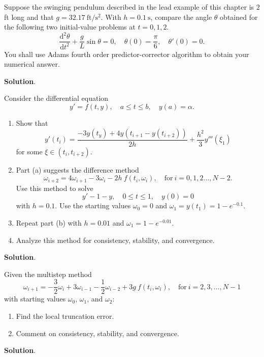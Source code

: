 \documentclass[11pt]{article}
\theoremstyle{break}
\newcommand{\dd}{\text{d}}
\numberwithin{equation}{theorem}
\begin{document}
\newpage
\begin{problem}\label{problem 15} %
    Suppose the swinging pendulum described in the lead example of this chapter is $2$ ft long and that $g = 32.17\ \text{ft}/\text{s}^2$. With $h = 0.1\ \text{s}$, compare the angle $\theta$ obtained for the following two initial-value problems at $t = 0, 1, 2$. $$\dfrac{\dd^2\theta}{\dd t^2}+\dfrac{g}{L}\sin\theta=0, \quad \theta(0)=\dfrac{\pi}{6},\quad \theta'(0)=0.$$ You shall use Adams fourth order predictor-corrector algorithm to obtain your numerical answer.
\end{problem}
\textbf{Solution}. 


\newpage
\begin{problem}\label{problem 16} %
    Consider the differential equation $$y'=f(t, y), \quad a\leq t\leq b, \quad y(a)=\alpha.$$
    \begin{enumerate}
        \item Show that $$y'(t_i)=\dfrac{-3y(t_y)+4y(t_{i+1}-y(t_{i+2}))}{2h}+\dfrac{h^2}{3}y'''(\xi_1)$$ for some $\xi\in(t_i, t_{i+2})$.
        \item Part (a) suggests the difference method $$\omega_{i+2}=4\omega_{i+1}-3\omega_{i}-2h\:f(t_i, \omega_i), \quad\text{for}\ i=0,1,2\dots, N-2.$$ Use this method to solve $$y'-1-y, \quad 0\leq t\leq 1, \quad y(0)=0$$ with $h=0.1$. Use the starting values $\omega_0=0$ and $\omega_1=y(t_1)=1-e^{-0.1}$.
        \item Repeat part (b) with $h=0.01$ and $\omega_1=1-e^{-0.01}$.
        \item Analyze this method for consistency, stability, and convergence.
    \end{enumerate}
\end{problem}
\textbf{Solution}.


\newpage
\begin{problem}\label{problem 17} %
    Given the multistep method $$\omega_{i+1}=-\dfrac{3}{2}\omega_i+3\omega_{i-1}-\dfrac{1}{2}\omega_{i-2}+3g\:f(t_i, \omega_i), \quad \text{for}\ i=2,3,\dots, N-1$$ with starting values $\omega_0$, $\omega_1$, and $\omega_2$:
    \begin{enumerate}
        \item Find the local truncation error.
        \item Comment on consistency, stability, and convergence.
    \end{enumerate}
\end{problem}
\textbf{Solution}.
\end{document}
